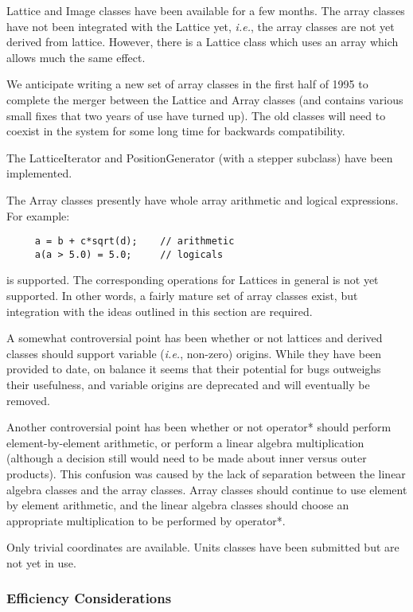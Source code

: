 Lattice and Image classes have been available for a few months. The
array classes have not been integrated with the Lattice yet, {\em
i.e.}, the array classes are not yet derived from lattice. However,
there is a Lattice class which uses an array which allows much the
same effect.

We anticipate writing a new set of array classes in the first half of
1995 to complete the merger between the Lattice and Array classes (and
contains various small fixes that two years of use have turned
up). The old classes will need to coexist in the system for some long
time for backwards compatibility.

The LatticeIterator and PositionGenerator (with a stepper subclass)
have been implemented.

The Array classes presently have whole array arithmetic and logical
expressions. For example:
\begin{verbatim}
     a = b + c*sqrt(d);    // arithmetic
     a(a > 5.0) = 5.0;     // logicals
\end{verbatim}
is supported. The corresponding operations for Lattices in general is
not yet supported. In other words, a fairly mature set of array
classes exist, but integration with the ideas outlined in this section
are required.

A somewhat controversial point has been whether or not lattices and
derived classes should support variable ({\em i.e.}, non-zero)
origins. While they have been provided to date, on balance it seems
that their potential for bugs outweighs their usefulness, and variable
origins are deprecated and will eventually be removed.

Another controversial point has been whether or not operator* should
perform element-by-element arithmetic, or perform a linear algebra
multiplication (although a decision still would need to be made about
inner versus outer products). This confusion was caused by the lack of
separation between the linear algebra classes and the array classes.
Array classes should continue to use element by element arithmetic,
and the linear algebra classes should choose an appropriate
multiplication to be performed by operator*.

Only trivial coordinates are available. Units classes have been
submitted but are not yet in use.

\subsubsection{Efficiency Considerations}

